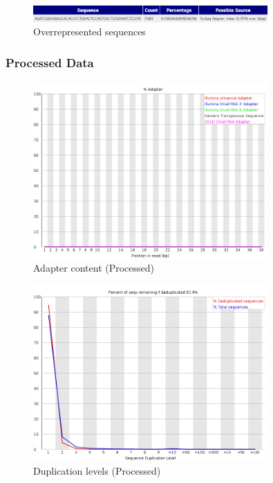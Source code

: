 \documentclass[UTF8]{ctexart}
\begin{document}
\begin{figure}[!htb]
	\centering
	\includegraphics[width=0.8\textwidth]{img/SRR14325859_FastQC_Origin_img/overrepresented_sequences.png}	
	\caption{Overrepresented sequences\protect}    
\end{figure}



\subsubsection{Processed Data}

\begin{figure}[!htb]
	\centering
	\includegraphics[width=0.8\textwidth]{img/SRR14325859_FastQC_Processed_img/adapter_content.png}	
	\caption{Adapter content (Processed)\protect}    
\end{figure}

\begin{figure}[!htb]
	\centering
	\includegraphics[width=0.8\textwidth]{img/SRR14325859_FastQC_Processed_img/duplication_levels.png}	
	\caption{Duplication levels (Processed)\protect}    
\end{figure}
\end{document}
